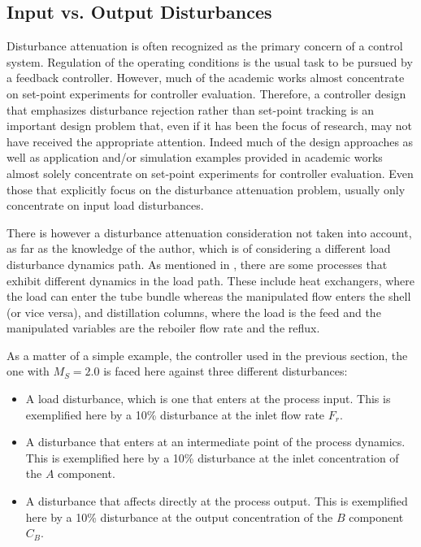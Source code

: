 \subsection{Input vs. Output Disturbances}
%
Disturbance attenuation is often recognized as the primary concern of a control system. Regulation of the operating conditions is the usual task to be pursued by a feedback controller. However, much of the academic works almost concentrate on set-point experiments for controller evaluation. Therefore, a controller design that emphasizes disturbance rejection rather than set-point tracking is an important design problem that, even if it has been the focus of research, may not have received the appropriate attention. Indeed much of the design approaches as well as application and/or simulation examples provided in academic works almost solely concentrate on set-point experiments for controller evaluation. Even those that explicitly focus on the disturbance attenuation problem, usually only concentrate on input load disturbances.

There is however a disturbance attenuation consideration not taken into account, as far as the knowledge of the author, which is of considering a different load disturbance dynamics path. As mentioned in \cite{Shinskey2002}, there are some processes that exhibit different dynamics in the load path. These include heat exchangers, where the load can enter the tube bundle whereas the manipulated flow enters the shell (or vice versa), and distillation columns, where the load is the feed and the manipulated variables are the reboiler flow rate and the reflux.

As a matter of a simple example, the controller used in the previous section, the one with $M_S=2.0$ is faced here against three different disturbances:
%
\begin{itemize}
\item A load disturbance, which is one that enters at the process input. This is exemplified here by a 10\% disturbance at the inlet flow rate $F_r$.
\item A disturbance that enters at an intermediate point of the process dynamics. This is exemplified here by a 10\% disturbance at the inlet concentration of the $A$ component.
\item A disturbance that affects directly at the process output. This is exemplified here by a 10\% disturbance at the output concentration of the $B$ component $C_B$.
 \end{itemize} 

